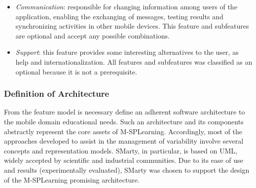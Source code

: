 \begin{itemize}
    \item \textit{Communication}: responsible for changing information among users of the application, enabling the exchanging of messages, testing results and synchronizing activities in other mobile devices. This feature and subfeatures are optional and accept any possible combinations.
    
    \item \textit{Support}: this feature provides some interesting alternatives to the user, as help and internationalization. All features and subfeatures was classified as an optional because it is not a prerequisite.
\end{itemize}

\subsubsection{Definition of Architecture}

From the feature model is necessary define an adherent software architecture to the mobile domain educational needs. Such an architecture and its components abstractly represent the core assets of M-SPLearning. Accordingly, most of the approaches developed to assist in the management of variability involve several concepts and representation models. SMarty, in particular, is based on UML, widely accepted by scientific and industrial communities. Due to its ease of use and results (experimentally evaluated), SMarty was chosen to support the design of the M-SPLearning promising architecture.

